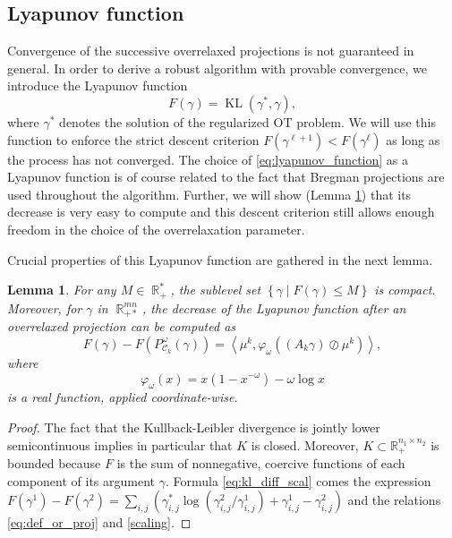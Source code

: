 \documentclass{article} %
\newcommand{\scal}[2]{\left\langle #1 , #2 \right\rangle}
\DeclareMathOperator{\IR}{\mathbb{R}}
\DeclareMathOperator{\Ccal}{\mathcal{C}}
\DeclareMathOperator{\KL}{KL}
\theoremstyle{plain}
\newtheorem{lemma}{Lemma}
\theoremstyle{definition}
\theoremstyle{remark}
\begin{document}
\subsection{Lyapunov function}
Convergence of the successive overrelaxed projections is not guaranteed in general. In order to derive a robust algorithm with provable convergence, we introduce the Lyapunov function 
\begin{equation}\label{eq:lyapunov_function}
F(\gamma) = \KL(\gamma^*, \gamma),
\end{equation}
where $\gamma^*$ denotes the solution of the regularized OT problem. We will use this function to enforce the strict descent criterion $F(\gamma^{\ell+1}) < F(\gamma^\ell)$ as long as the process has not converged.
%
The choice of \eqref{eq:lyapunov_function} as a Lyapunov function is of course related to the fact that Bregman projections are used throughout the algorithm. Further, we will show (Lemma \ref{lemma:lyapunov_decrease}) that its decrease is very easy to compute and this descent criterion still allows enough freedom in the choice of the overrelaxation parameter.

Crucial properties of this Lyapunov function are gathered in the next lemma.
\begin{lemma} \label{lemma:lyapunov_decrease}
	For any $M \in \IR_+^*$, the sublevel set $\left\{ \gamma \mid F(\gamma) \le M \right\}$ is compact.
	Moreover, for $\gamma$ in $\IR^{mn}_{+*}$, the decrease of the Lyapunov function after an overrelaxed projection can be computed as
	\begin{equation} \label{eq:kl_diff_scal}
	F(\gamma) - F(P^\omega_{\Ccal_k}(\gamma)) = 
	\scal{\mu^k}{\varphi_\omega \left((A_k \gamma) \oslash \mu^k \right)},
	\end{equation}
	where
	\begin{equation}
	\varphi_\omega(x) = x(1-x^{-\omega}) - \omega \log x
	\end{equation}
	is a real function, applied coordinate-wise.
\end{lemma}

\begin{proof}
The fact that the Kullback-Leibler divergence is jointly lower semicontinuous implies in particular that $K$ is closed. Moreover, $K\subset \mathbb{R}^{n_1\times n_2}_+$ is bounded because $F$ is the sum of nonnegative, coercive functions of each component of its argument $\gamma$.
%
Formula \eqref{eq:kl_diff_scal} comes the expression $F(\gamma^1)-F(\gamma^2)= \sum_{i,j}\left(\gamma^*_{i,j}\log(\gamma^2_{i,j}/\gamma^1_{i,j})+\gamma^1_{i,j}-\gamma^2_{i,j}\right)$ and the relations \eqref{eq:def_or_proj} and \eqref{scaling}.
\end{proof}
\end{document}
